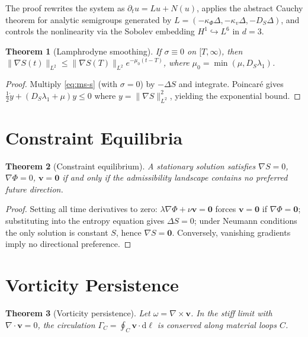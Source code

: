 \documentclass[12pt, oneside]{book}
\theoremstyle{plain}
\newtheorem{theorem}{Theorem}[chapter]
\theoremstyle{definition}
\newcommand{\vfield}{\mathbf{v}}
\newcommand{\dd}{\mathrm{d}}
\newcommand{\nab}{\nabla}
\begin{document}
The proof rewrites the system as $\partial_t u = Lu + N(u)$, applies the abstract
Cauchy theorem for analytic semigroups generated by
$L = (-\kappa_\Phi\Delta, -\kappa_v\Delta, -D_S\Delta)$, and controls the
nonlinearity via the Sobolev embedding $H^1\hookrightarrow L^6$ in $d=3$.

\begin{theorem}[Lamphrodyne smoothing]
\label{thm:smoothing}
If $\sigma\equiv 0$ on $[T,\infty)$, then
$\|\nab S(t)\|_{L^2} \leq \|\nab S(T)\|_{L^2} e^{-\mu_0(t-T)}$,
where $\mu_0 = \min(\mu, D_S\lambda_1)$.
\end{theorem}

\begin{proof}
Multiply \eqref{eq:ms-s} (with $\sigma=0$) by $-\Delta S$ and integrate. Poincar\'e
gives $\tfrac{1}{2}\dot{y} + (D_S\lambda_1+\mu)y \leq 0$ where
$y = \|\nab S\|^2_{L^2}$, yielding the exponential bound.
\end{proof}

\section{Constraint Equilibria}
\label{sec:equilibria}

\begin{theorem}[Constraint equilibrium]
\label{thm:equilibrium}
A stationary solution satisfies $\nab S = 0$, $\nab\Phi = 0$, $\vfield = \mathbf{0}$
if and only if the admissibility landscape contains no preferred future direction.
\end{theorem}

\begin{proof}
Setting all time derivatives to zero: $\lambda\nab\Phi + \nu\vfield = \mathbf{0}$
forces $\vfield = \mathbf{0}$ if $\nab\Phi = \mathbf{0}$; substituting into the
entropy equation gives $\Delta S = 0$; under Neumann conditions the only solution
is constant $S$, hence $\nab S = \mathbf{0}$. Conversely, vanishing gradients imply
no directional preference.
\end{proof}

\section{Vorticity Persistence}
\label{sec:vorticity}

\begin{theorem}[Vorticity persistence]
\label{thm:vorticity}
Let $\omega = \nab\times\vfield$. In the stiff limit with $\nab\cdot\vfield = 0$,
the circulation $\Gamma_C = \oint_C \vfield\cdot\dd\ell$ is conserved along material
loops $C$.
\end{theorem}
\end{document}
